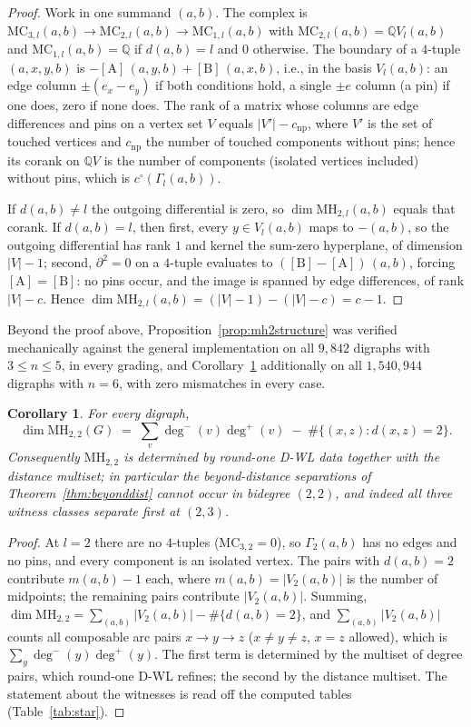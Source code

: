\documentclass[pdflatex,sn-mathphys,Numbered]{sn-jnl}
\theoremstyle{thmstyleone}
\newtheorem{corollary}[theorem]{Corollary}
\theoremstyle{thmstyletwo}
\newcommand{\MH}{\mathrm{MH}}
\newcommand{\MC}{\mathrm{MC}}
\newcommand{\QQ}{\mathbb{Q}}
\begin{document}
\begin{proof}
Work in one summand $(a,b)$. The complex is
$\MC_{3,l}(a,b) \to \MC_{2,l}(a,b) \to \MC_{1,l}(a,b)$ with
$\MC_{2,l}(a,b) = \QQ V_l(a,b)$ and $\MC_{1,l}(a,b) = \QQ$ if
$d(a,b) = l$ and $0$ otherwise. The boundary of a $4$-tuple
$(a,x,y,b)$ is $-[\mathrm{A}]\,(a,y,b) + [\mathrm{B}]\,(a,x,b)$, i.e.,
in the basis $V_l(a,b)$: an edge column $\pm(e_x - e_y)$ if both
conditions hold, a single $\pm e$ column (a pin) if one does, zero if
none does. The rank of a matrix whose columns are edge differences and
pins on a vertex set $V$ equals $|V'| - c_{\mathrm{np}}$, where $V'$ is
the set of touched vertices and $c_{\mathrm{np}}$ the number of touched
components without pins; hence its corank on $\QQ V$ is the number of
components (isolated vertices included) without pins, which is
$c^{\circ}(\Gamma_l(a,b))$.

If $d(a,b) \ne l$ the outgoing differential is zero, so
$\dim\MH_{2,l}(a,b)$ equals that corank. If $d(a,b) = l$, then first,
every $y \in V_l(a,b)$ maps to $-(a,b)$, so the outgoing differential
has rank $1$ and kernel the sum-zero hyperplane, of dimension
$|V| - 1$; second, $\partial^2 = 0$ on a $4$-tuple evaluates to
$([\mathrm{B}] - [\mathrm{A}])\,(a,b)$, forcing
$[\mathrm{A}] = [\mathrm{B}]$: no pins occur, and the image is spanned
by edge differences, of rank $|V| - c$. Hence
$\dim\MH_{2,l}(a,b) = (|V| - 1) - (|V| - c) = c - 1$.
\end{proof}

Beyond the proof above, Proposition~\ref{prop:mh2structure} was
verified mechanically against the general implementation on all
$9{,}842$ digraphs with $3 \le n \le 5$, in every grading, and
Corollary~\ref{cor:mh22} additionally on all $1{,}540{,}944$ digraphs
with $n = 6$, with zero mismatches in every case.

\begin{corollary}\label{cor:mh22}
For every digraph,
\[
\dim \MH_{2,2}(G) \;=\; \sum_{v} \deg^{-}(v)\deg^{+}(v)
\;-\; \#\{(x,z) : d(x,z) = 2\}.
\]
Consequently $\MH_{2,2}$ is determined by round-one D-WL data together
with the distance multiset; in particular the beyond-distance
separations of Theorem~\ref{thm:beyonddist} cannot occur in bidegree
$(2,2)$, and indeed all three witness classes separate first at
$(2,3)$.
\end{corollary}

\begin{proof}
At $l = 2$ there are no $4$-tuples ($\MC_{3,2} = 0$), so
$\Gamma_2(a,b)$ has no edges and no pins, and every component is an
isolated vertex. The pairs with $d(a,b) = 2$ contribute
$m(a,b) - 1$ each, where $m(a,b) = |V_2(a,b)|$ is the number of
midpoints; the remaining pairs contribute $|V_2(a,b)|$. Summing,
$\dim\MH_{2,2} = \sum_{(a,b)} |V_2(a,b)| - \#\{d(a,b) = 2\}$, and
$\sum_{(a,b)} |V_2(a,b)|$ counts all composable arc pairs
$x \to y \to z$ ($x \ne y \ne z$, $x = z$ allowed), which is
$\sum_y \deg^{-}(y)\deg^{+}(y)$. The first term is determined by the
multiset of degree pairs, which round-one D-WL refines; the second by
the distance multiset. The statement about the witnesses is read off
the computed tables (Table~\ref{tab:star}).
\end{proof}
\end{document}
